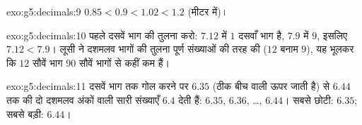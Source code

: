 \begin{solution}{exo:g5:decimals:9}
$0.85 < 0.9 < 1.02 < 1.2$ (मीटर में)।
\end{solution}

\begin{solution}{exo:g5:decimals:10}
पहले दसवें भाग की तुलना करो: $7.12$ में $1$ दसवाँ भाग है, $7.9$
में $9$, इसलिए $7.12 < 7.9$। लूसी ने दशमलव भागों की तुलना पूर्ण
संख्याओं की तरह की ($12$ बनाम $9$), यह भूलकर कि $12$ सौवें भाग
$90$ सौवें भागों से कहीं कम हैं।
\end{solution}

\begin{solution}{exo:g5:decimals:11}
दसवें भाग तक गोल करने पर $6.35$ (ठीक बीच वाली ऊपर जाती है) से
$6.44$ तक की दो दशमलव अंकों वाली सारी संख्याएँ $6.4$ देती हैं:
$6.35$, $6.36$, \dots, $6.44$। सबसे छोटी: $6.35$; सबसे बड़ी: $6.44$।
\end{solution}
